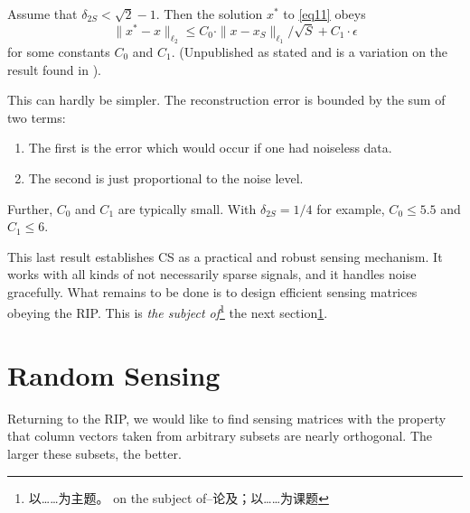 \begin{theorem}\cite{16}
	\label{th3}
	Assume that $\delta_{2S}<\sqrt{2}-1$. Then the solution $x^*$ to \cref{eq11} obeys
	\begin{equation}
	\label{eq12}
	\|x^*-x\|_{\ell_2} \leq C_0 \cdot \|x-x_S\|_{\ell_1}/ \sqrt{S}+C_1 \cdot \epsilon
	\end{equation}
	for some constants $C_0$ and $C_1$. (Unpublished as stated and is a variation on the result found in \cite{16}).
\end{theorem}

This can hardly be simpler. The reconstruction error is bounded by the sum of two terms:
\begin{enumerate}[1)]
	\item The first is the error which would occur if one had noiseless data.
	\item The second is just proportional to the noise level.
\end{enumerate}
Further, $C_0$ and $C_1$ are typically small. With $\delta_{2S}=1/4$ for example, $C_0\leq 5.5$ and $C_1\leq 6$.

This last result establishes CS as a practical and robust sensing mechanism. It works with all kinds of not necessarily sparse signals, and it handles noise gracefully. What remains to be done is to design efficient sensing matrices obeying the RIP. This is \emph{the subject of}\footnote{以……为主题。 on the subject of--论及；以……为课题} the next section\cref{sectionrandomsensing}.

\section{Random Sensing}
\label{sectionrandomsensing}
Returning to the RIP, we would like to find sensing matrices with the property that column vectors 	taken from arbitrary subsets are nearly orthogonal. The larger these subsets, the better.

